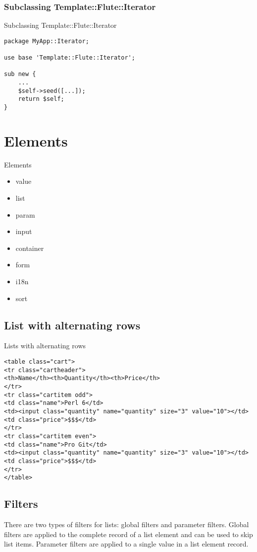 \subsubsection{Subclassing Template::Flute::Iterator}
\begin{frame}[fragile]{Subclassing Template::Flute::Iterator}
\begin{lstlisting}
package MyApp::Iterator;

use base 'Template::Flute::Iterator';

sub new {
    ...
    $self->seed([...]);
    return $self;
}
\end{lstlisting}
\end{frame}

\section{Elements}
\begin{frame}{Elements}
\begin{itemize}
\item value
\item list
\item param
\item input
\item container
\item form
\item i18n
\item sort
\end{itemize}
\end{frame}

\subsection{List with alternating rows}
\begin{frame}[fragile]{Lists with alternating rows}
\begin{lstlisting}
<table class="cart">
<tr class="cartheader">
<th>Name</th><th>Quantity</th><th>Price</th>
</tr>
<tr class="cartitem odd">
<td class="name">Perl 6</td>
<td><input class="quantity" name="quantity" size="3" value="10"></td>
<td class="price">$$$</td>
</tr>
<tr class="cartitem even">
<td class="name">Pro Git</td>
<td><input class="quantity" name="quantity" size="3" value="10"></td>
<td class="price">$$$</td>
</tr>
</table>
\end{lstlisting}
\end{frame}

\subsection{Filters}
There are two types of filters for lists: global filters and
parameter filters. Global filters are applied to the complete
record of a list element and can be used to skip list items.
Parameter filters are applied to a single value in a list
element record.

